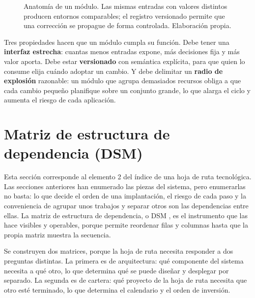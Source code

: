\documentclass[11pt,letterpaper]{article}
\begin{document}
\begin{figure}[ht]
  \caption{Anatomía de un módulo. Las mismas entradas con valores distintos
  producen entornos comparables; el registro versionado permite que una
  corrección se propague de forma controlada. Elaboración propia.}
  \label{fig:modulo}
\end{figure}

Tres propiedades hacen que un módulo cumpla su función. Debe tener una
\textbf{interfaz estrecha}: cuantas menos entradas expone, más decisiones fija
y más valor aporta. Debe estar \textbf{versionado} con semántica explícita,
para que quien lo consume elija cuándo adoptar un cambio. Y debe delimitar un
\textbf{radio de explosión} razonable: un módulo que agrupa demasiados
recursos obliga a que cada cambio pequeño planifique sobre un conjunto grande,
lo que alarga el ciclo y aumenta el riesgo de cada aplicación.

\section{Matriz de estructura de dependencia (DSM)}
\label{sec:dsm}

Esta sección corresponde al elemento 2 del índice de una hoja de ruta
tecnológica. Las secciones anteriores han enumerado las piezas del sistema,
pero enumerarlas no basta: lo que decide el orden de una implantación, el
riesgo de cada paso y la conveniencia de agrupar unos trabajos y separar otros
son las dependencias entre ellas. La matriz de estructura de dependencia, o
DSM \parencite{steward1981,eppinger2012}, es el instrumento que las hace
visibles y operables, porque permite reordenar filas y columnas hasta que la
propia matriz muestra la secuencia.

Se construyen dos matrices, porque la hoja de ruta necesita responder a dos
preguntas distintas. La primera es de arquitectura: qué componente del sistema
necesita a qué otro, lo que determina qué se puede diseñar y desplegar por
separado. La segunda es de cartera: qué proyecto de la hoja de ruta necesita
que otro esté terminado, lo que determina el calendario y el orden de
inversión.
\end{document}
